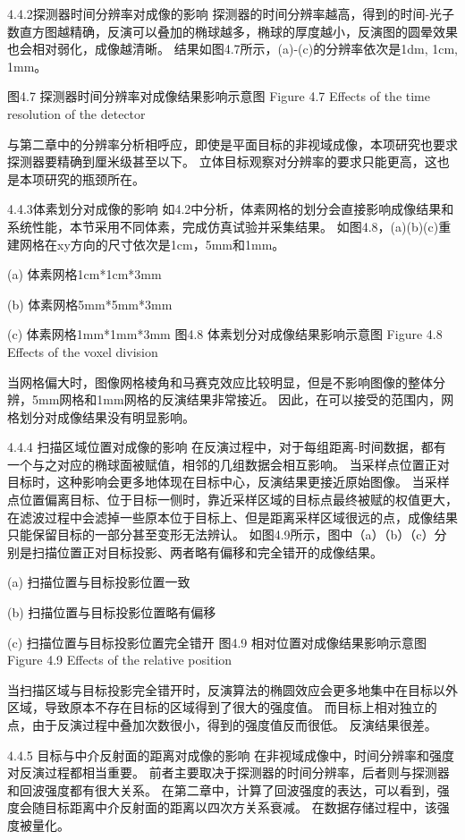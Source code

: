 4.4.2探测器时间分辨率对成像的影响
探测器的时间分辨率越高，得到的时间-光子数直方图越精确，反演可以叠加的椭球越多，椭球的厚度越小，反演图的圆晕效果也会相对弱化，成像越清晰。
结果如图4.7所示，(a)-(c)的分辨率依次是1dm, 1cm, 1mm。

     
  
 
图4.7 探测器时间分辨率对成像结果影响示意图
Figure 4.7 Effects of the time resolution of the detector

与第二章中的分辨率分析相呼应，即使是平面目标的非视域成像，本项研究也要求探测器要精确到厘米级甚至以下。
立体目标观察对分辨率的要求只能更高，这也是本项研究的瓶颈所在。

4.4.3体素划分对成像的影响
如4.2中分析，体素网格的划分会直接影响成像结果和系统性能，本节采用不同体素，完成仿真试验并采集结果。
如图4.8，(a)(b)(c)重建网格在xy方向的尺寸依次是1cm，5mm和1mm。


 
(a) 体素网格1cm*1cm*3mm
 
(b) 体素网格5mm*5mm*3mm
 
(c) 体素网格1mm*1mm*3mm
图4.8 体素划分对成像结果影响示意图
Figure 4.8 Effects of the voxel division

当网格偏大时，图像网格棱角和马赛克效应比较明显，但是不影响图像的整体分辨，5mm网格和1mm网格的反演结果非常接近。
因此，在可以接受的范围内，网格划分对成像结果没有明显影响。

4.4.4 扫描区域位置对成像的影响
在反演过程中，对于每组距离-时间数据，都有一个与之对应的椭球面被赋值，相邻的几组数据会相互影响。
当采样点位置正对目标时，这种影响会更多地体现在目标中心，反演结果更接近原始图像。
当采样点位置偏离目标、位于目标一侧时，靠近采样区域的目标点最终被赋的权值更大，在滤波过程中会滤掉一些原本位于目标上、但是距离采样区域很远的点，成像结果只能保留目标的一部分甚至变形无法辨认。
如图4.9所示，图中（a）（b）（c）分别是扫描位置正对目标投影、两者略有偏移和完全错开的成像结果。


 
(a) 扫描位置与目标投影位置一致
 
(b) 扫描位置与目标投影位置略有偏移
 
(c) 扫描位置与目标投影位置完全错开
图4.9 相对位置对成像结果影响示意图
Figure 4.9 Effects of the relative position

当扫描区域与目标投影完全错开时，反演算法的椭圆效应会更多地集中在目标以外区域，导致原本不存在目标的区域得到了很大的强度值。
而目标上相对独立的点，由于反演过程中叠加次数很小，得到的强度值反而很低。
反演结果很差。

4.4.5 目标与中介反射面的距离对成像的影响
在非视域成像中，时间分辨率和强度对反演过程都相当重要。
前者主要取决于探测器的时间分辨率，后者则与探测器和回波强度都有很大关系。
在第二章中，计算了回波强度的表达，可以看到，强度会随目标距离中介反射面的距离以四次方关系衰减。
在数据存储过程中，该强度被量化。

